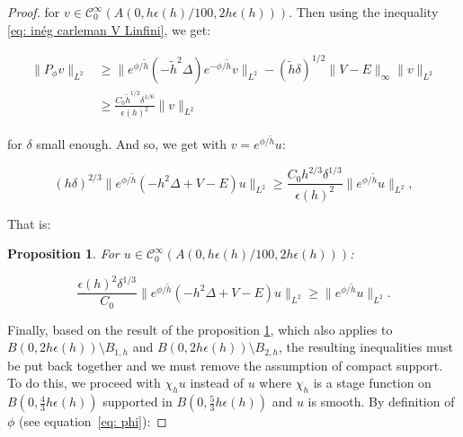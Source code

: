 \documentclass[leqno,11pt,letterpaper, english]{amsart}
\newcommand{\nn}{\nonumber}
\theoremstyle{plain}
\newtheorem{prop}{Proposition}[section]
\theoremstyle{definition}
\numberwithin{equation}{section}
\begin{document}
\begin{proof}
		for $v \in \mathcal{C}_0^{\infty}(A(0,h\epsilon(h)/100,2h\epsilon(h)))$.
	Then using the inequality \ref{eq: inég carleman V Linfini}, we get:
	
	\begin{align}
		\big\lVert P_\phi v \big\lVert_{L^2}&\geq \Big\lVert e^{\phi/\tilde{h}}(-\tilde{h}^2 \Delta)e^{-\phi/\tilde{h}} v \Big\lVert_{L^2}- \left(\tilde{h}\delta\right)^{1/2}\big\lVert V-E \big\lVert_\infty \big\lVert v \big\lVert_{L^2}\nn\\
		&\geq \frac{C_0\tilde{h}^{1/2}\delta^{1/6}}{\epsilon(h)^2 }\big\lVert v \big\lVert_{L^2}
	\end{align}
	
	for $\delta$  small enough. And so, we get with $v=e^{\phi/\tilde{h}}u$:
	
	\begin{equation}
		\left(h\delta\right)^{2/3}\Big\lVert e^{\phi/\tilde{h}}(-h^2\Delta+V-E) u\Big\lVert_{L^2}\geq \frac{C_0 h^{2/3}\delta^{1/3}}{\epsilon(h)^2}\Big\lVert e^{\phi/\tilde{h}}u \Big\lVert_{L^2},
	\end{equation}
	
	That is:
	
	\begin{prop}
		\label{prop: Carleman_avant_recollement}
		For $u \in\mathcal{C}_0^{\infty} (A(0, h\epsilon(h)/100, 2h\epsilon(h)))$:
		
		\begin{equation}
			\frac{\epsilon(h)^2\delta^{1/3}}{C_0}\Big\lVert e^{\phi/\tilde{h}}(-h^2\Delta+V-E) u\Big\lVert_{L^2}\geq \Big\lVert e^{\phi/\tilde{h}}u\Big\lVert_{L^2}.
		\end{equation}
		
	\end{prop}
	
	Finally, based on the result of the proposition \ref{prop: Carleman_avant_recollement}, which also applies to $B(0,2h\epsilon(h))\setminus B_{1,h}$ and $B(0,2h\epsilon(h))\setminus B_{2,h}$,  the resulting inequalities must be put back together and we must remove the assumption of compact support. To do this, we proceed with $\chi_{h} u$ instead of $u$ where $\chi_{h}$ is a stage function on $B(0,\frac{4}{3}h\epsilon(h))$ supported in $B(0,\frac{5}{3}h\epsilon(h))$ and $u$ is smooth. By definition of $\phi$ (see equation~\ref{eq: phi}):
	

\end{proof}
\end{document}
